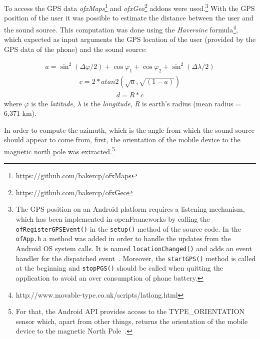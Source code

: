 \documentclass[journal]{IEEEtran}
\begin{document}
To access the GPS data \emph{ofxMaps}\footnote{https://github.com/bakercp/ofxMaps} and \emph{ofxGeo}\footnote{https://github.com/bakercp/ofxGeo} addons were used.\footnote{The GPS position on an Android platform requires a listening mechanism, which has been implemented in openFrameworks by calling the \texttt{ofRegisterGPSEvent()} in the \texttt{setup()} method of the source code. In the \texttt{ofApp.h} a method was added in order to handle the updates from the Android OS system calls. It is named \texttt{locationChanged()} and adds an event handler for the dispatched event~\cite{noble2009}. Moreover, the \texttt{startGPS()} method is called at the beginning and \texttt{stopPGS()} should be called when quitting the application to avoid an over consumption of phone battery.} With the GPS position of the user it was possible to estimate the distance between the user and the sound source. This computation was done using the \textit{Haversine} formula\footnote{http://www.movable-type.co.uk/scripts/latlong.html}, which expected as input arguments the GPS location of the user (provided by the GPS data of the phone) and the sound source:

\begin{equation}\label{eq:distancehaversine1}
\begin{split}
a = {\sin}^{2}(\Delta\varphi / 2) + \cos \varphi _1 + \cos \varphi _2 + \sin^2(\Delta\lambda / 2)
\end{split}
\end{equation}
\begin{equation}\label{eq:distancehaversine2}
\begin{split}
c = 2 * atan2(\sqrt{a},\sqrt{(1-a)}) 
\end{split}
\end{equation}
\begin{equation}\label{eq:distancehaversine3}
\begin{split}
d = R * c
\end{split}
\end{equation}
where $\varphi$ is the \emph{latitude}, $\lambda$ is the \emph{longitude}, \emph{R} is earth's radius (mean radius = 6,371 km).

In order to compute the azimuth, which is the angle from which the sound source should appear to come from, first, the orientation of the mobile device to the magnetic north pole was extracted.\footnote{For that, the Android API provides access to the TYPE\_ORIENTATION sensor which, apart from other things, returns the orientation of the mobile device to the magnetic North Pole~\cite{AndroidOrientation}.} 
\end{document}
